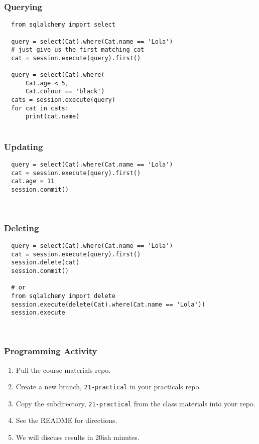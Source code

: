 \documentclass[10pt]{beamer}
\begin{document}
\begin{frame}[fragile]
  \frametitle{Querying}
  
  \begin{verbatim}
  from sqlalchemy import select
  
  query = select(Cat).where(Cat.name == 'Lola')
  # just give us the first matching cat
  cat = session.execute(query).first()  
  
  query = select(Cat).where(
      Cat.age < 5,
      Cat.colour == 'black')
  cats = session.execute(query)
  for cat in cats:
      print(cat.name)       
         
  \end{verbatim}
    
  \end{frame}

\begin{frame}[fragile]
  \frametitle{Updating}
  
  \begin{verbatim}
  query = select(Cat).where(Cat.name == 'Lola')
  cat = session.execute(query).first()  
  cat.age = 11
  session.commit() 
    
         
  \end{verbatim}
\end{frame}

\begin{frame}[fragile]
  \frametitle{Deleting}
  
  \begin{verbatim}
  query = select(Cat).where(Cat.name == 'Lola')
  cat = session.execute(query).first()  
  session.delete(cat)
  session.commit() 
  
  # or
  from sqlalchemy import delete
  session.execute(delete(Cat).where(Cat.name == 'Lola'))
  session.execute
    
         
  \end{verbatim}
\end{frame}


\begin{frame}
  \frametitle{Programming Activity}
  
  \begin{enumerate}
    \item Pull the course materials repo.
    \item Create a new branch, \texttt{21-practical} in your practicals repo.
    \item Copy the subdirectory, \texttt{21-practical} from the class materials into your repo.
    \item See the README for directions.
    \item We will discuss results in 20ish minutes.
  \end{enumerate}      
\end{frame}
  
\end{document}
